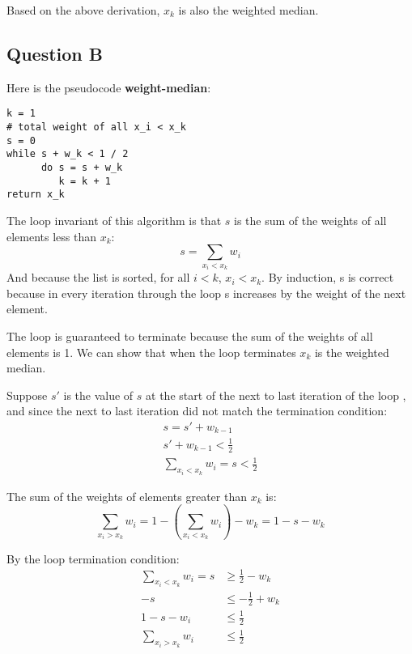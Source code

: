 \documentclass{article}
\begin{document}
Based on the above derivation, $x_k$ is also the weighted median.

\subsection{Question B}

Here is the pseudocode \textbf{weight-median}:
\begin{lstlisting}
k = 1
# total weight of all x_i < x_k
s = 0
while s + w_k < 1 / 2
      do s = s + w_k
         k = k + 1
return x_k
\end{lstlisting}

The loop invariant of this algorithm is that $s$ is the sum of the weights of all elements less than $x_k$:
\begin{equation}
    s = \sum_{x_i < x_k} w_i
\end{equation}
And because the list is sorted, for all $i<k$, $x_i<x_k$. By induction, s is correct because in every iteration through the loop s increases by the weight of the next element.

The loop is guaranteed to terminate because the sum of the weights of all elements is 1. 
We can show that when the loop terminates $x_k$ is the weighted median.

Suppose $s'$ is the value of $s$ at the start of the next to last iteration of the loop
, and since the next to last iteration did not match the termination condition:
\begin{equation}
\label{e4}
\begin{aligned}
    s = s' + w_{k-1}\\
    s' + w_{k-1} < \frac{1}{2}\\
    \sum_{x_i<x_k} w_i = s < \frac{1}{2}
\end{aligned}
\end{equation}

The sum of the weights of elements greater than $x_k$ is:
\begin{equation}
    \sum_{x_i>x_k} w_i = 1 - (\sum_{x_i<x_k} w_i) - w_k = 1 - s - w_k
\end{equation}

By the loop termination condition:
\begin{equation}
    \begin{aligned}
        \sum_{x_i<x_k} w_i = s &\geq \frac{1}{2} - w_k\\
        -s &\leq -\frac{1}{2} + w_k\\
        1 - s - w_i & \leq \frac{1}{2}\\
        \sum_{x_i>x_k} w_i & \leq \frac{1}{2}
    \end{aligned}
\end{equation}
\end{document}
